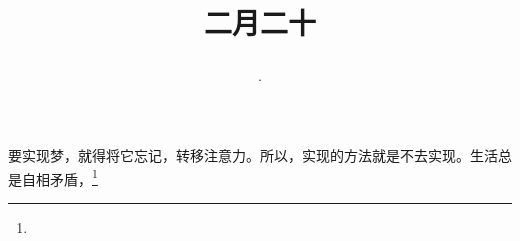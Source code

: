 \title{\date[d=29,m=3,y=2024][year:cn-y,年,month:cn,day:cn,日,·,weekday]·二月二十 }
要实现梦，就得将它忘记，转移注意力。所以，实现的方法就是不去实现。生活总是自相矛盾，\footnote{ }

